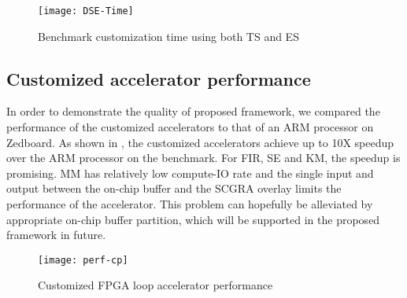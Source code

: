 \begin{figure}[tb]
    \centering
    \texttt{[image: DSE-Time]}
    \caption{Benchmark customization time using both TS and ES}
    \label{fig:DSE-Time}
\end{figure}


\subsection{Customized accelerator performance}
In order to demonstrate the quality of proposed framework, we compared the performance of the
customized accelerators to that of an ARM processor on Zedboard. As shown in , the
customized accelerators achieve up to 10X speedup over the ARM processor on the benchmark. For FIR, SE
and KM, the speedup is promising. MM has relatively low compute-IO rate and the single input and
output between the on-chip buffer and the SCGRA overlay limits the performance of the accelerator.
This problem can hopefully be alleviated by appropriate on-chip buffer partition, which will be
supported in the proposed framework in future.
\begin{figure}[tb]
    \centering
    \texttt{[image: perf-cp]}
    \caption{Customized FPGA loop accelerator performance}
    \label{fig:DSE}
\end{figure}


